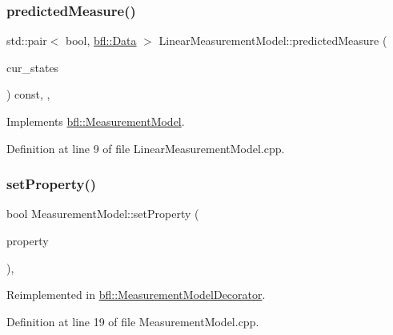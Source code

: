 \subsubsection{\texorpdfstring{predicted\+Measure()}{predictedMeasure()}}
{\footnotesize\ttfamily std\+::pair$<$ bool, \mbox{\hyperlink{namespacebfl_af6b103c6821db1b54452f776fdd9dd02}{bfl\+::\+Data}} $>$ Linear\+Measurement\+Model\+::predicted\+Measure (\begin{DoxyParamCaption}\item[{const Eigen\+::\+Ref$<$ const Eigen\+::\+Matrix\+Xd $>$ \&}]{cur\+\_\+states }\end{DoxyParamCaption}) const\hspace{0.3cm}{\ttfamily [override]}, {\ttfamily [virtual]}, {\ttfamily [inherited]}}



Implements \mbox{\hyperlink{classbfl_1_1MeasurementModel_a8fc8798aa2db48f428d4ce59b33b5307}{bfl\+::\+Measurement\+Model}}.



Definition at line 9 of file Linear\+Measurement\+Model.\+cpp.

\mbox{\label{classbfl_1_1MeasurementModel_af97e18b52d1a3f365dd5982b8cc4aff7}} 
\subsubsection{\texorpdfstring{set\+Property()}{setProperty()}}
{\footnotesize\ttfamily bool Measurement\+Model\+::set\+Property (\begin{DoxyParamCaption}\item[{const std\+::string \&}]{property }\end{DoxyParamCaption})\hspace{0.3cm}{\ttfamily [virtual]}, {\ttfamily [inherited]}}



Reimplemented in \mbox{\hyperlink{classbfl_1_1MeasurementModelDecorator_a531a891152d7bf83e56370664d54f42f}{bfl\+::\+Measurement\+Model\+Decorator}}.



Definition at line 19 of file Measurement\+Model.\+cpp.



